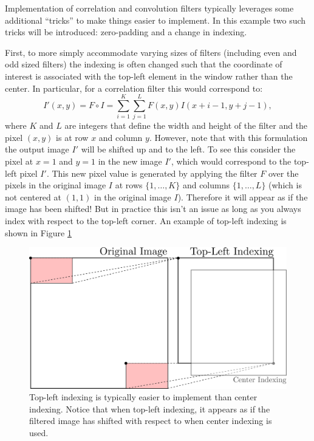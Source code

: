 \begin{example} \label{ex:padding}
\theoremstyle{definition}
Implementation of correlation and convolution filters typically leverages some additional ``tricks'' to make things easier to implement. In this example two such tricks will be introduced: zero-padding and a change in indexing. 

First, to more simply accommodate varying sizes of filters (including even and odd sized filters) the indexing is often changed such that the coordinate of interest is associated with the top-left element in the window rather than the center. In particular, for a correlation filter this would correspond to:
\begin{equation}
  \label{eq:correlation_newindex}
    I'(x,y) = F \circ I = \sum_{i=1}^K \sum_{j=1}^L F(x,y)I(x+i-1,y+j-1),
\end{equation}
where $K$ and $L$ are integers that define the width and height of the filter and the pixel $(x,y)$ is at row $x$ and column $y$. However, note that with this formulation the output image $I'$ will be shifted up and to the left. To see this consider the pixel at $x=1$ and $y=1$ in the new image $I'$, which would correspond to the top-left pixel $I'$. This new pixel value is generated by applying the filter $F$ over the pixels in the original image $I$ at rows $\{1,\dots,K\}$ and columns $\{1,\dots,L\}$ (which is not centered at $(1,1)$ in the original image $I$). Therefore it will appear as if the image has been shifted! But in practice this isn't an issue as long as you always index with respect to the top-left corner. An example of top-left indexing is shown in Figure \ref{fig:topleftfilter}
\begin{figure}[ht]
  \centering
  \includegraphics[width=.65\textwidth]{tex/figs/ch11_figs/topleftfilter_nopadding.png}
    \caption{Top-left indexing is typically easier to implement than center indexing. Notice that when top-left indexing, it appears as if the filtered image has shifted with respect to when center indexing is used.}
    \label{fig:topleftfilter}
\end{figure}


\end{example}
